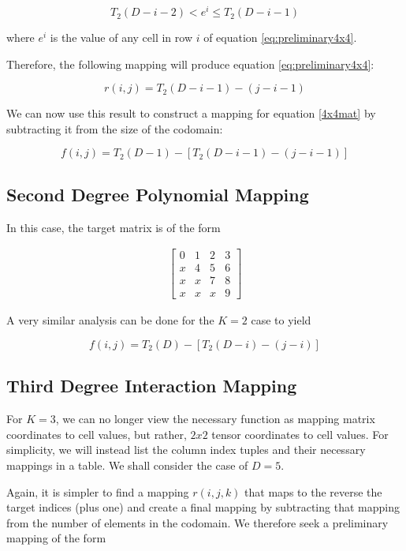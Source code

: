 \documentclass{article}
\begin{document}
\begin{equation}
T_2(D-i-2) < e^i \le T_2(D-i-1)
\end{equation}

where $e^i$ is the value of any cell in row $i$ of equation \ref{eq:preliminary4x4}.

Therefore, the following mapping will produce equation \ref{eq:preliminary4x4}:

\begin{equation}
r(i, j) = T_2(D-i-1) - (j - i - 1)
\end{equation}

We can now use this result to construct a mapping for equation \ref{4x4mat} by subtracting it from the size of the codomain:

\begin{equation}
f(i, j) = T_2(D-1) - [T_2(D-i-1) - (j - i - 1)]
\end{equation}

\subsection{Second Degree Polynomial Mapping}
In this case, the target matrix is of the form

\begin{align}
\begin{bmatrix}
0 & 1 & 2 & 3 \\
x & 4 & 5 & 6 \\
x & x & 7 & 8 \\
x & x & x & 9
\end{bmatrix}
\label{eq:4x4mat}
\end{align}

A very similar analysis can be done for the $K=2$ case to yield

\begin{equation}
f(i, j) = T_2(D) - [T_2(D-i) - (j - i)]
\end{equation}

\subsection{Third Degree Interaction Mapping}
For $K=3$, we can no longer view the necessary function as mapping matrix coordinates to cell values, but rather, $2x2$ tensor coordinates to cell values.
For simplicity, we will instead list the column index tuples and their necessary mappings in a table.
We shall consider the case of $D=5$.

Again, it is simpler to find a mapping $r(i, j, k)$ that maps to the reverse the target indices (plus one) and create a final mapping by subtracting that mapping from the number of elements in the codomain.
We therefore seek a preliminary mapping of the form
\end{document}

